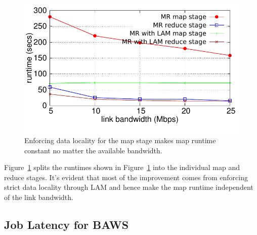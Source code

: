 \begin{figure}[!ht]
\centering\includegraphics[width=\columnwidth]{figs/stage-time-localMap.pdf}
\vspace{-1.2em}
\caption{Enforcing data locality for the map stage makes map runtime constant no matter the available bandwidth.}
\label{fig:stage-time-localMap}
\vspace{.7em}
\end{figure}

Figure~\ref{fig:stage-time-localMap} splits the runtimes shown in Figure~\ref{fig:stage-time-localMap} into the individual map and reduce stages. It's evident that most of the improvement comes from enforcing strict data locality through LAM and hence make the map runtime independent of the link bandwidth. 

\subsection{Job Latency for BAWS}

